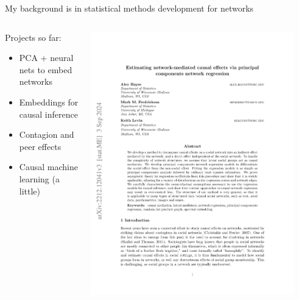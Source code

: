 \documentclass[aspectratio=169]{beamer}
\theoremstyle{remark}
\begin{document}
\begin{frame}{My background is in statistical methods development for networks}
    \vfill
    \begin{columns}
        \begin{column}{0.5\textwidth}
            Projects so far:
            \begin{itemize}
                \item PCA + neural nets to embed networks
                \item Embeddings for causal inference
                \item Contagion and peer effects
                \item Causal machine learning (a little)
            \end{itemize}
        \end{column}
        \begin{column}{0.5\textwidth}
            \centering
            \includegraphics[width=0.92\textwidth, page=1]{mediation.pdf}
        \end{column}
    \end{columns}
\end{frame}
\end{document}
